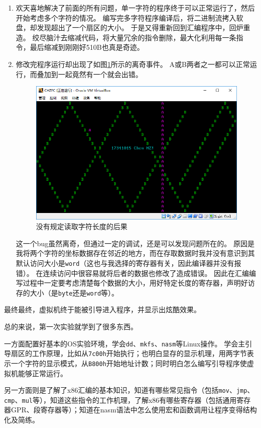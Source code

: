 \documentclass[logo,reportComp]{thesis}
\begin{document}
\begin{enumerate}
\item 欢天喜地解决了前面的所有问题，单一字符的程序终于可以正常运行了，然后开始考虑多个字符的情况。
编写完多字符程序编译后，将二进制流拷入软盘，却发现超出了一个扇区的大小。
于是又得重新回到汇编程序中，回炉重造。
绞尽脑汁去缩减代码，将大量冗余的指令删除，最大化利用每一条指令，最后缩减到刚刚好510B也真是奇迹。

\item 修改完程序运行却出现了如图\ref{fig:bug}所示的离奇事件。
A或B两者之一都可以正常运行，而叠加到一起竟然有一个就会出错。
\begin{figure}[H]
\centering
\includegraphics[width=0.8\linewidth]{fig/bug.PNG}
\caption{没有规定读取字符长度的后果}
\label{fig:bug}
\end{figure}
这一个bug虽然离奇，但通过一定的调试，还是可以发现问题所在的。
原因是我将两个字符的坐标数据存在邻近的地方，而在存取数据时我并没有意识到其默认访问大小是\verb'word'（这也与我选择的寄存器有关，因此编译器并没有报错）。
在连续访问中很容易就将后者的数据也修改了造成错误。
因此在汇编编写过程中一定要考虑清楚每个数据的大小，用好特定长度的寄存器，声明好访存的大小（是\verb'byte'还是\verb'word'等）。

\end{enumerate}

最终最终，虚拟机终于能被引导进入程序，并显示出炫酷效果。

总的来说，第一次实验就学到了很多东西。

一方面配置好基本的OS实验环境，学会\verb'dd'、\verb'mkfs'、\verb'nasm'等Linux操作。
学会主引导扇区的工作原理，比如从\verb'7c00h'开始执行；也明白显存的显示机理，用两字节表示一个字符的显示模式，从\verb'B800h'开始地址计数；同时明白怎么编写引导程序使虚拟机能够正常运行。

另一方面则是了解了x86汇编的基本知识，知道有哪些常见指令（包括\verb'mov'、\verb'jmp'、\verb'cmp'、\verb'mul'等），知道这些指令的工作机理，了解x86有哪些寄存器（包括通用寄存器GPR、段寄存器等）；知道在nasm语法中怎么使用宏和函数调用让程序变得结构化及简练。
\end{document}
